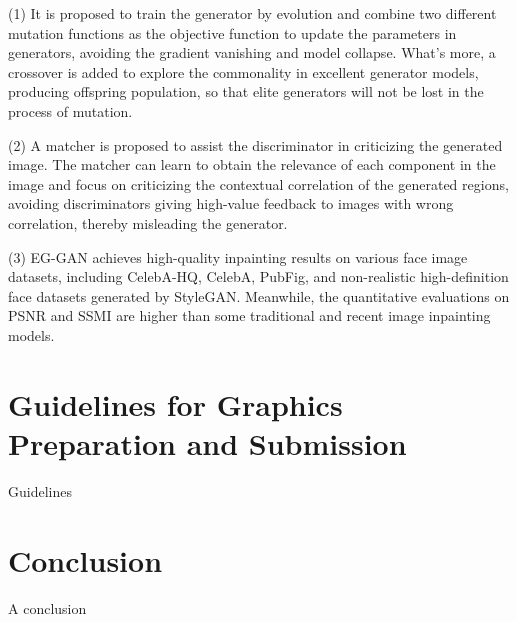 \documentclass[journal]{IEEEtran}
\begin{document}
(1) It is proposed to train the generator by evolution and combine two different mutation functions as the objective function to update the parameters in generators, avoiding the gradient vanishing and model collapse. What's more, a crossover is added to explore the commonality in excellent generator models, producing offspring population, so that elite generators will not be lost in the process of mutation.

(2) A matcher is proposed to assist the discriminator in criticizing the generated image. The matcher can learn to obtain the relevance of each component in the image and focus on criticizing the contextual correlation of the generated regions, avoiding discriminators giving high-value feedback to images with wrong correlation, thereby misleading the generator.

(3) EG-GAN achieves high-quality inpainting results on various face image datasets, including CelebA-HQ, CelebA, PubFig, and non-realistic high-definition face datasets generated by StyleGAN. Meanwhile, the quantitative evaluations on PSNR and SSMI are higher than some traditional and recent image inpainting models.


\section{Guidelines for Graphics Preparation and Submission}
Guidelines

\section{Conclusion}
A conclusion 




\end{document}
